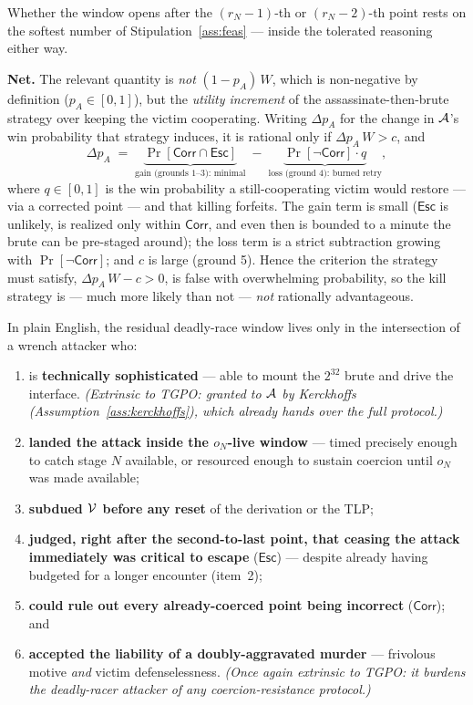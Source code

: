 Whether the window opens after the $(r_N{-}1)$-th or $(r_N{-}2)$-th point rests
on the softest number of Stipulation~\ref{ass:feas} --- inside the tolerated
reasoning either way.

\medskip
\noindent\textbf{Net.} The relevant quantity is \emph{not} $(1 - p_A)\,W$, which
is non-negative by definition ($p_A \in [0,1]$), but the \emph{utility increment}
of the assassinate-then-brute strategy over keeping the victim cooperating.
Writing $\Delta p_A$ for the change in $\mathcal{A}$'s win probability that strategy
induces, it is rational only if $\Delta p_A\,W > c$, and
\[
  \Delta p_A \;=\;
  \underbrace{\Pr[\mathsf{Corr}\cap\mathsf{Esc}]}_{\text{gain (grounds 1--3): minimal}}
  \;-\;
  \underbrace{\Pr[\neg\mathsf{Corr}]\cdot q}_{\text{loss (ground 4): burned retry}},
\]
where $q \in [0,1]$ is the win probability a still-cooperating victim would
restore --- via a corrected point --- and that killing forfeits. The gain term is
small ($\mathsf{Esc}$ is unlikely, is realized only within $\mathsf{Corr}$, and
even then is bounded to a minute the brute can be pre-staged around); the loss
term is a strict subtraction growing with $\Pr[\neg\mathsf{Corr}]$; and $c$ is
large (ground 5). Hence the criterion the strategy must satisfy,
$\Delta p_A\,W - c > 0$, is false with overwhelming probability, so the kill
strategy is --- much more likely than not --- \emph{not} rationally advantageous.

\smallskip
\noindent In plain English, the residual deadly-race window lives only in the
intersection of a wrench attacker who:
\begin{enumerate}[nosep,leftmargin=1.9em]
  \item is \textbf{technically sophisticated} --- able to mount the $2^{32}$ brute
        and drive the interface. \emph{(Extrinsic to TGPO: granted to $\mathcal{A}$
        by Kerckhoffs (Assumption~\ref{ass:kerckhoffs}), which already hands over
        the full protocol.)}
  \item \textbf{landed the attack inside the $o_N$-live window} --- timed
        precisely enough to catch stage $N$ available, or resourced enough to
        sustain coercion until $o_N$ was made available;
  \item \textbf{subdued $\mathcal{V}$ before any reset} of the derivation or the TLP;
  \item \textbf{judged, right after the second-to-last point, that ceasing the
        attack immediately was critical to escape} ($\mathsf{Esc}$) --- despite
        already having budgeted for a longer encounter (item~2);
  \item \textbf{could rule out every already-coerced point being incorrect}
        ($\mathsf{Corr}$); and
  \item \textbf{accepted the liability of a doubly-aggravated murder} --- frivolous
        motive \emph{and} victim defenselessness. \emph{(Once again extrinsic to
        TGPO: it burdens the deadly-racer attacker of any coercion-resistance
        protocol.)}
\end{enumerate}

